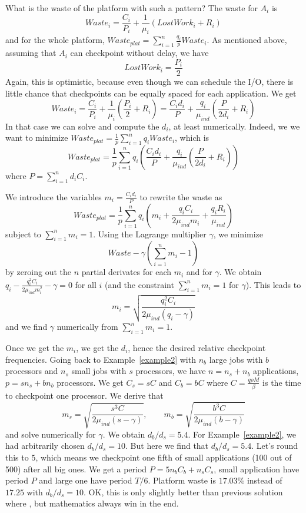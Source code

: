 \documentclass{article}
\newcommand{\ema}[1]{\ensuremath{#1}}
\newcommand{\Waste}{\ema{\mathit{Waste}}\xspace}
\begin{document}
What is the waste of the platform with such a pattern? The waste for $A_{i}$ is 
$$\Waste_{i} = \frac{C_{i}}{P_{i}} + \frac{1}{\mu_{i}} (LostWork_{i} + R_{i})$$
and for the whole platform, $\Waste_{plat} = \sum_{i=1}^{n} \frac{q_{i}}{p} \Waste_{i}$.
As mentioned above, assuming that $A_{i}$ can checkpoint without delay, we have
$$LostWork_{i} = \frac{P_{i}}{2}$$
Again, this is  optimistic, because even though we can schedule the I/O, there is little chance that checkpoints can be equally spaced for each application.
We get
$$\Waste_{i} = \frac{C_{i}}{P_{i}} + \frac{1}{\mu_{i}} (\frac{P_{i}}{2} + R_{i})
= \frac{C_{i} d_{i}}{P}+ \frac{q_{i}}{\mu_{ind}} (\frac{P}{2d_{i}} + R_{i})$$
In that case we can solve and compute the $d_{i}$, at least numerically. 
Indeed, we we want to minimize 
$\Waste_{plat} = \frac{1}{p} \sum_{i=1}^{n} q_{i} \Waste_{i}$, 
which is 
$$\Waste_{plat} = \frac{1}{p} \sum_{i=1}^{n} q_{i} (\frac{C_{i} d_{i}}{P}+ \frac{q_{i}}{\mu_{ind}} (\frac{P}{2d_{i}} + R_{i}))$$
where $P  = \sum_{i=1}^{n} d_{i} C_{i}$.

We introduce the variables $m_{i} = \frac{C_{i} d_{i}}{P}$ to rewrite the waste as
$$\Waste_{plat}= \frac{1}{p} \sum_{i=1}^{n} q_{i} (m_{i}+ \frac{q_{i}C_{i}}{2 \mu_{ind} m_{i}} +\frac{q_{i} R_{i}}{\mu_{ind}})$$
subject to $\sum_{i=1}^{n} m_{i} = 1$.
Using the Lagrange multiplier $\gamma$, we minimize
$$Waste - \gamma (\sum_{i=1}^{n} m_{i} - 1)$$
by zeroing out the $n$ partial derivates for each $m_{i}$ and for $\gamma$.
We obtain
$q_{i} - \frac{q_{i}^{2} C_{i}}{2 \mu_{ind} m_{i}^{2}} - \gamma = 0$ for all $i$ (and the constraint
$\sum_{i=1}^{n} m_{i} = 1$ for $\gamma$). This leads to 
$$m_{i} = \sqrt{\frac{q_{i}^{2} C_{i}}{2 \mu_{ind} (q_{i} - \gamma)}}$$
and we find $\gamma$ numerically from $\sum_{i=1}^{n} m_{i} = 1$.

Once we get the $m_{i}$, we get the $d_{i}$, hence the desired relative checkpoint frequencies.
Going back to Example~\ref{example2} with $n_{b}$ large jobs with $b$ processors
and $n_{s}$ small jobs with $s$ processors,
we have $n = n_{s} + n_{b}$ applications, $p =  s n_{s} + b n_{b}$ processors. We get
$C_{s} = s C$ and $C_{b} = b C$ where $C = \frac{q\rho M}{\beta}$ is the time to checkpoint one processor. We derive that 
$$m_{s} = \sqrt{\frac{s^{3} C}{2 \mu_{ind} (s - \gamma)}}, \qquad m_{b} = \sqrt{\frac{b^{3} C}{2 \mu_{ind} (b - \gamma)}}$$
and solve numerically for $\gamma$. We obtain
$d_{b}/d_{s}=5.4$.
For Example~\ref{example2}, we had arbitrarily chosen $d_{b}/d_{s}=10$.
But here we find that $d_{b}/d_{s}=5.4$. Let's round this to $5$, which means we checkpoint one fifth
of small applications (100 out of 500) after all big ones.
We get a period  $P=5n_{b}C_{b}+n_{s}C_{s}$, small application have period $P$
and large one have period $T/6$.  Platform waste is $17.03\%$ instead of $17.25$ with $d_{b}/d_{s}=10$.
OK, this is only slightly better than previous solution where , but mathematics 
 always win in the end.
\end{document}
